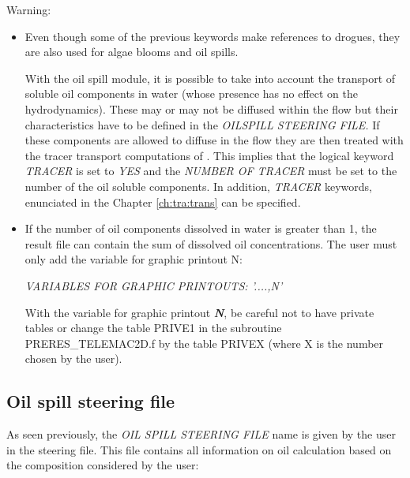 \begin{WarningBlock}{Warning:}
\begin{itemize}
\item  Even though some of the previous keywords make references to drogues, they are also used for algae blooms and oil spills.

 With the oil spill module, it is possible to take into account the transport of soluble oil components in water (whose presence has no effect on the hydrodynamics). These may or may not be diffused within the flow but their characteristics have to be defined in the \textit{OILSPILL STEERING FILE.} If these components are allowed to diffuse in the flow they are then treated with the tracer transport computations of . This implies that the logical keyword \textit{TRACER} is set to \textit{YES} and the \textit{NUMBER OF TRACER} must be set to the number of the oil soluble components. In addition, \textit{TRACER} keywords, enunciated in the Chapter \ref{ch:tra:trans} can be specified.

\item If the number of oil components dissolved in water is greater than 1, the result file can contain the sum of dissolved oil concentrations. The user must only add the variable for graphic printout N:

\textit{VARIABLES FOR GRAPHIC PRINTOUTS: '....,N'}

With the variable for graphic printout \textbf{\textit{N}}, be careful not to have private tables or change the table PRIVE1 in the subroutine PRERES\_TELEMAC2D.f by the table PRIVEX (where X is the number chosen by the user).
\end{itemize}
\end{WarningBlock}

\subsection{ Oil spill steering file}

 As seen previously, the \textit{OIL SPILL STEERING FILE }name is given by the user in the \telemac steering file. This file contains all information on oil calculation based on the composition considered by the user:


